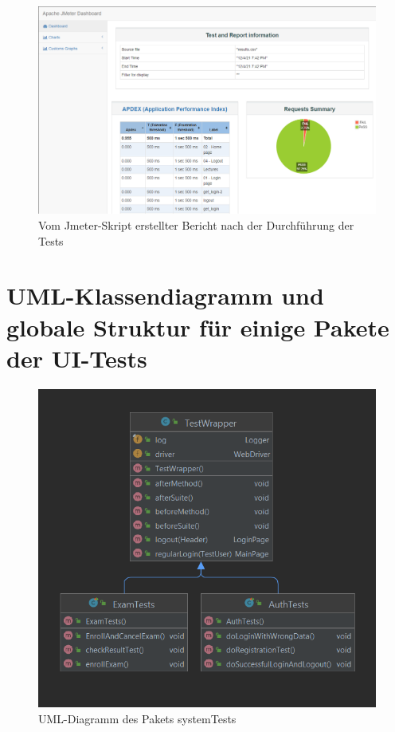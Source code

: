 \begin{figure}[H]
    \centering
    \includegraphics[scale=0.5]{images/jmeter-report}
    \caption{Vom Jmeter-Skript erstellter Bericht nach der Durchführung der Tests} \label{fig:jmeter-report}
\end{figure}


\section{UML-Klassendiagramm und globale Struktur für einige Pakete der UI-Tests}

\begin{figure}[H]
    \centering
    \includegraphics[scale=0.5]{images/system-test-uml}
    \caption{UML-Diagramm des Pakets systemTests} \label{fig:system-package}
\end{figure}

